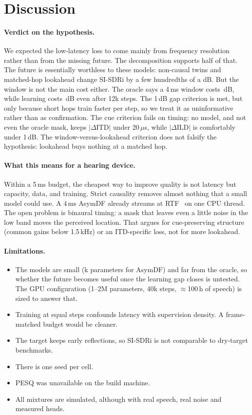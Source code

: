 \section{Discussion}
\paragraph{Verdict on the hypothesis.}
We expected the low-latency loss to come mainly from frequency resolution
rather than from the missing future. The decomposition supports half of
that. The future is essentially worthless to these models: non-causal
twins and matched-hop lookahead change SI-SDRi by a few hundredths of a dB.
But the window is not the main cost either. The oracle says a 4\,ms window
costs \GapResolutionFourms\,dB, while learning costs
\LongGapLearningFourms\,dB even after 12k steps. The 1\,dB gap criterion is
met, but only because short hops train faster per step, so we treat it as
uninformative rather than as confirmation. The cue criterion fails on
timing: no model, and not even the oracle mask, keeps $|\Delta$ITD$|$
under 20\,$\mu$s, while $|\Delta$ILD$|$ is comfortably under 1\,dB. The
window-versus-lookahead criterion does not falsify the hypothesis:
lookahead buys nothing at a matched hop.

\paragraph{What this means for a hearing device.}
Within a 5\,ms budget, the cheapest way to improve quality is not latency
but capacity, data, and training. Strict causality removes almost nothing
that a small model could use. A 4\,ms AsymDF already streams at RTF
\RtfstftasymFourms\ on one CPU thread. The open problem is binaural timing:
a mask that leaves even a little noise in the low band moves the perceived
location. That argues for cue-preserving structure (common gains below
1.5\,kHz) or an ITD-specific loss, not for more lookahead.

\paragraph{Limitations.}
\begin{itemize}
\item The models are small (\stftasymFourmsearParams k parameters for
AsymDF) and far from the oracle, so whether the future becomes useful once
the learning gap closes is untested. The GPU configuration (1--2M
parameters, 40k steps, $\approx$100\,h of speech) is sized to answer that.
\item Training at equal steps confounds latency with supervision density.
A frame-matched budget would be cleaner.
\item The target keeps early reflections, so SI-SDRi is not comparable to
dry-target benchmarks.
\item There is one seed per cell.
\item PESQ was unavailable on the build machine.
\item All mixtures are simulated, although with real speech, real noise and
measured heads.
\end{itemize}
